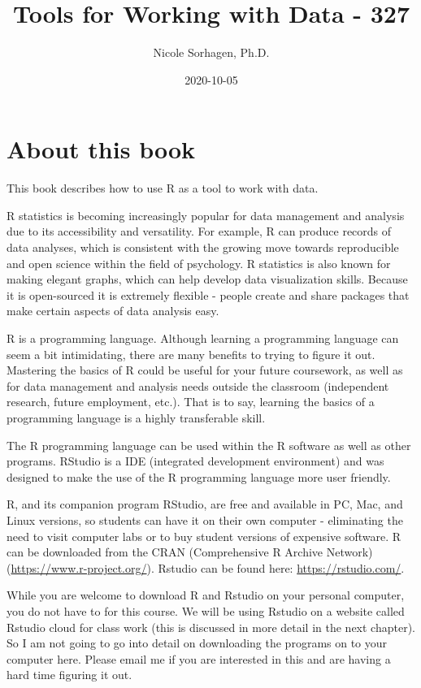\documentclass[
]{book}
\title{Tools for Working with Data - 327}
\author{Nicole Sorhagen, Ph.D.}
\date{2020-10-05}
\begin{document}
\maketitle

{
\setcounter{tocdepth}{1}
\tableofcontents
}
\hypertarget{about-this-book}{%
\chapter{About this book}\label{about-this-book}}

This book describes how to use R as a tool to work with data.

R statistics is becoming increasingly popular for data management and analysis due to its accessibility and versatility. For example, R can produce records of data analyses, which is consistent with the growing move towards reproducible and open science within the field of psychology. R statistics is also known for making elegant graphs, which can help develop data visualization skills. Because it is open-sourced it is extremely flexible - people create and share packages that make certain aspects of data analysis easy.

R is a programming language. Although learning a programming language can seem a bit intimidating, there are many benefits to trying to figure it out. Mastering the basics of R could be useful for your future coursework, as well as for data management and analysis needs outside the classroom (independent research, future employment, etc.). That is to say, learning the basics of a programming language is a highly transferable skill.

The R programming language can be used within the R software as well as other programs. RStudio is a IDE (integrated development environment) and was designed to make the use of the R programming language more user friendly.

R, and its companion program RStudio, are free and available in PC, Mac, and Linux versions, so students can have it on their own computer - eliminating the need to visit computer labs or to buy student versions of expensive software. R can be downloaded from the CRAN (Comprehensive R Archive Network) (\url{https://www.r-project.org/}). Rstudio can be found here: \url{https://rstudio.com/}.

While you are welcome to download R and Rstudio on your personal computer, you do not have to for this course. We will be using Rstudio on a website called Rstudio cloud for class work (this is discussed in more detail in the next chapter). So I am not going to go into detail on downloading the programs on to your computer here. Please email me if you are interested in this and are having a hard time figuring it out.
\end{document}

